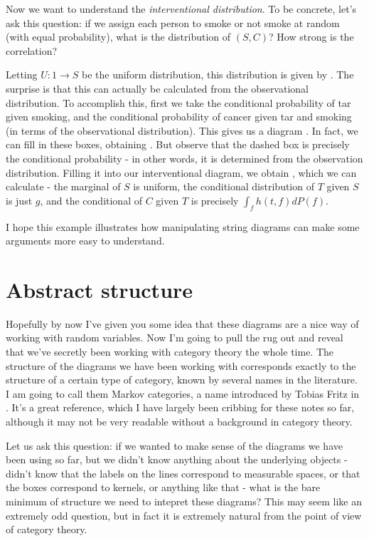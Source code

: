 \documentclass{article}
\begin{document}
Now we want to understand the \emph{interventional distribution}.
To be concrete, let's ask this question: if we assign each person to smoke or not smoke at random (with equal probability), what is the distribution of $(S,C)$? How strong is the correlation?

Letting $U: 1 \to S$ be the uniform distribution, this distribution is given by .
The surprise is that this can actually be calculated from the observational distribution.
To accomplish this, first we take the conditional probability of tar given smoking, and the conditional probability of cancer given tar and smoking (in terms of the observational distribution).
This gives us a diagram .
In fact, we can fill in these boxes, obtaining .
But observe that the dashed box is precisely the conditional probability - in other words, it is determined from the observation distribution.
Filling it into our interventional diagram, we obtain  , which we can calculate - the marginal of $S$ is uniform, the conditional distribution of $T$ given $S$ is just $g$, and the conditional of $C$ given $T$ is precisely $\int_f h(t,f) dP(f)$.


I hope this example illustrates how manipulating string diagrams can make some arguments more easy to understand.


\section{Abstract structure}
Hopefully by now I've given you some idea that these diagrams are a nice way of working with random variables.
Now I'm going to pull the rug out and reveal that we've secretly been working with category theory the whole time.
The structure of the diagrams we have been working with corresponds exactly to the structure of a certain type of category,
known by several names in the literature. I am going to call them Markov categories, a name introduced by Tobias Fritz in .
It's a great reference, which I have largely been cribbing for these notes so far, although it may not be very readable without a background in category theory.

Let us ask this question: if we wanted to make sense of the diagrams we have been using so far, but we didn't know anything about the underlying objects - didn't know that the labels on the lines correspond to measurable spaces, or that the boxes correspond to kernels, or anything like that - what is the bare minimum of structure we need to intepret these diagrams?
This may seem like an extremely odd question, but in fact it is extremely natural from the point of view of category theory.
\end{document}
